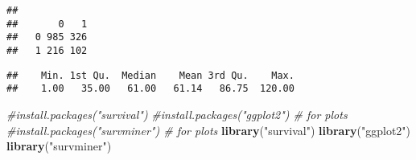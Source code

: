 \documentclass[10pt,]{book}
\newenvironment{Shaded}{\begin{snugshade}}{\end{snugshade}}
\newcommand{\CommentTok}[1]{\textcolor[rgb]{0.56,0.35,0.01}{\textit{#1}}}
\newcommand{\DecValTok}[1]{\textcolor[rgb]{0.00,0.00,0.81}{#1}}
\newcommand{\KeywordTok}[1]{\textcolor[rgb]{0.13,0.29,0.53}{\textbf{#1}}}
\newcommand{\NormalTok}[1]{#1}
\newcommand{\OperatorTok}[1]{\textcolor[rgb]{0.81,0.36,0.00}{\textbf{#1}}}
\newcommand{\StringTok}[1]{\textcolor[rgb]{0.31,0.60,0.02}{#1}}
\begin{document}
\begin{Shaded}
\end{Shaded}

\begin{verbatim}
##    
##       0   1
##   0 985 326
##   1 216 102
\end{verbatim}

\begin{Shaded}
\end{Shaded}

\begin{verbatim}
##    Min. 1st Qu.  Median    Mean 3rd Qu.    Max. 
##    1.00   35.00   61.00   61.14   86.75  120.00
\end{verbatim}

\begin{Shaded}
\begin{Highlighting}[]
\CommentTok{#install.packages("survival")}
\CommentTok{#install.packages("ggplot2") # for plots}
\CommentTok{#install.packages("survminer") # for plots}
\KeywordTok{library}\NormalTok{(}\StringTok{"survival"}\NormalTok{)}
\KeywordTok{library}\NormalTok{(}\StringTok{"ggplot2"}\NormalTok{)}
\KeywordTok{library}\NormalTok{(}\StringTok{"survminer"}\NormalTok{)}
\end{Highlighting}
\end{Shaded}
\end{document}
